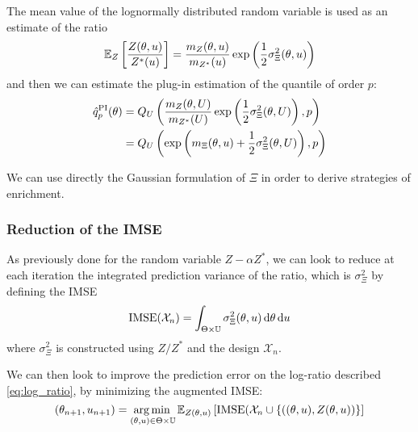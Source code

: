 \documentclass[../../Main_ManuscritThese.tex]{subfiles}
\begin{document}
The mean value of the lognormally distributed random variable is used
as an estimate of the ratio
\begin{equation}
  \label{eq:mean_ratio_logn}
\mathbb{E}_Z\left[\frac{Z(\theta, u)}{Z^*(u)}\right] = \frac{m_Z(\theta, u)}{m_{Z^*}(u)}\exp\left(\frac{1}{2}\sigma^2_{\Xi}(\theta, u)\right) 
\end{equation}
and then we can estimate the plug-in estimation of the quantile of
order $p$:
\begin{align}
  \hat{q}^{\mathrm{PI}}_p(\theta) &= Q_{U}\left(\frac{m_Z(\theta, U)}{m_{Z^*}(U)}\exp\left(\frac{1}{2}\sigma^2_{\Xi}(\theta, U)\right),p \right)\\ &= Q_{U}\left(\exp\left(m_{\Xi}(\theta, u)+\frac{1}{2}\sigma^2_{\Xi}(\theta, U)\right),p \right)
\end{align}


We can use directly the Gaussian formulation of $\Xi$ in order to
derive strategies of enrichment.
  
  \subsubsection{Reduction of the IMSE}
  \label{ssec:reduction_imse_quantile}
  As previously done for the random variable $Z - \alpha Z^*$, we can
  look to reduce at each iteration the integrated prediction variance
  of the ratio, which is $\sigma^2_{\Xi}$ by defining the IMSE
\begin{equation}
  \operatorname{\mathrm{IMSE}}(\mathcal{X}_n) = \int_{\Theta\times\mathbb{U}} \sigma_{\Xi}^2(\theta, u) \,\mathrm{d}\theta\,\mathrm{d}u
\end{equation}
where $\sigma_\Xi^2$ is constructed using $Z/Z^*$ and the design $\mathcal{X}_n$.

We can then look to improve the prediction error on the log-ratio
described \cref{eq:log_ratio}, by minimizing the augmented IMSE:
\begin{equation}
  \label{eq:aIMSE_Xi}
 (\theta_{n+1}, u_{n+1}) = \operatorname*{arg\,min \,}_{(\theta, u) \in \Theta \times \mathbb{U}}\mathbb{E}_{Z(\theta,u)}\left[\operatorname{\mathrm{IMSE}}(\mathcal{X}_n \cup \left\{\left((\theta, u),Z(\theta, u)\right)\right\}\right]
\end{equation}
\end{document}
